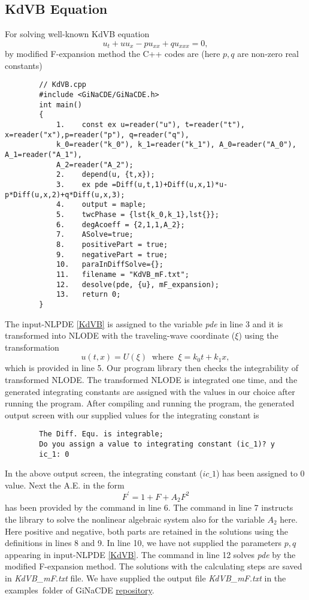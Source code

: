 \documentclass[prd,aps,floats,showkeys,nofootinbib,notitlepage]{revtex4-2}
\begin{document}
	\subsection{KdVB Equation}
	For solving well-known KdVB equation %
	\begin{equation}\label{KdVB}
		{u_t} + u{u_x} - p{u_{xx}} + q{u_{xxx}} = 0,
	\end{equation}
	by modified F-expansion method the C++ codes are (here $p,q$ are non-zero real constants)\\
	\begin{verbatim}
		// KdVB.cpp
		#include <GiNaCDE/GiNaCDE.h>
		int main()
		{
			1.    const ex u=reader("u"), t=reader("t"), x=reader("x"),p=reader("p"), q=reader("q"),
			k_0=reader("k_0"), k_1=reader("k_1"), A_0=reader("A_0"), A_1=reader("A_1"), 
			A_2=reader("A_2");   
			2.    depend(u, {t,x});
			3.    ex pde =Diff(u,t,1)+Diff(u,x,1)*u-p*Diff(u,x,2)+q*Diff(u,x,3);
			4.    output = maple;  
			5.    twcPhase = {lst{k_0,k_1},lst{}};
			6.    degAcoeff = {2,1,1,A_2};
			7.    ASolve=true;
			8.    positivePart = true; 
			9.    negativePart = true;
			10.   paraInDiffSolve={};
			11.   filename = "KdVB_mF.txt";
			12.   desolve(pde, {u}, mF_expansion);
			13.   return 0;
		}
	\end{verbatim}
	The input-NLPDE \eqref{KdVB} is assigned to the variable {\em pde} in line 3 and it is transformed into NLODE with the traveling-wave coordinate ($\xi$) using the transformation 
	\begin{equation}\label{KdVB_twtrans}
		u(t,x)=U(\xi)\;\;\text{where}\;\;\xi=k_0t+k_1x,
	\end{equation}
	which is provided in line 5.
	Our program library then checks the integrability of transformed NLODE. The transformed NLODE is integrated one time, and the generated integrating constants are assigned with the values in our choice after running the program. After compiling and running the program, the generated output screen with our supplied values for the integrating constant is
	\begin{verbatim}
		The Diff. Equ. is integrable;
		Do you assign a value to integrating constant (ic_1)? y
		ic_1: 0
	\end{verbatim}
	In the above output screen, the integrating constant ($ic\_1$) has been assigned to $0$ value.
	Next the A.E. in the form 
	\begin{equation}\label{KdVBAE}
		F^{\prime}=1+F+A_2F^2
	\end{equation}
	has been provided by the command in line 6. The command in line 7 instructs the library to solve the nonlinear algebraic system also for the variable $A_2$ here.
	Here positive and negative, both parts are retained in the solutions using the definitions in lines 8 and 9. In line 10, we have not supplied the parameters $p,q$ appearing in input-NLPDE \eqref{KdVB}.
	The command in line 12 solves {\em pde} by the modified F-expansion method. 
	The solutions with the calculating steps are saved in {\em KdVB\_mF.txt} file.
	We have supplied the output file {\em KdVB\_mF.txt} in the examples\ folder of GiNaCDE \href{https://github.com/mithun218/GiNaCDE}{repository}.
	
\end{document}
